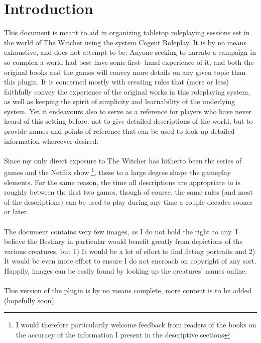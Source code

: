\documentclass[parskip=full,11pt,%
footheight=38pt]{scrreport}
\title{\thetitle}
\author{\href{mailto:TurambarOfManyNames@outlook.com}{Turambar of Many Names}}
\begin{document}
\makeatletter





\maketitle
\setcounter{tocdepth}{1}
\tableofcontents

\chapter*{Introduction}
This document is meant to aid in organizing tabletop roleplaying sessions set in the world of The Witcher using the system Cogent Roleplay.
It is by no means exhaustive, and does not attempt to be: Anyone seeking to narrate a campaign in so complex a world had best have some first-
hand experience of it, and both the original books and the games will convey more details on any given topic than this plugin. It is concerned
mostly with creating rules that (more or less) faithfully convey the experience of the original works in this roleplaying system, as well as
keeping the spirit of simplicity and learnability of the underlying system. Yet it
endeavours also to serve as a reference for players who have never heard of this setting before, not to give detailed descriptions of the world,
but to provide names and points of reference that can be used to look up detailed information whereever desired.
\\\\
Since my only direct exposure to The Witcher has hitherto been the series of games and the Netflix show
\footnote{I would therefore particularily welcome feedback from readers of the books on the accuracy of the information I present in the descriptive
	sections}, these to a large degree shape the gameplay elements.
For the same reason, the time all descriptions are appropriate to is roughly between the first two games, though of course, the same rules (and
most of the descriptions) can be used to play during any time a couple decades sooner or later.
\\\\
The document contains very few images, as I do not hold the right to any. I believe the Bestiary in particular would benefit greatly
from depictions of the various creatures, but 1) It would be a lot of effort to find fitting portraits and 2) It would be even more effort to
ensure I do not encroach on copyright of any sort. Happily, images can be easily found by looking up the creatures' names online.
\\\\
This version of the plugin is by no means complete, more content is to be added (hopefully soon).
\end{document}
